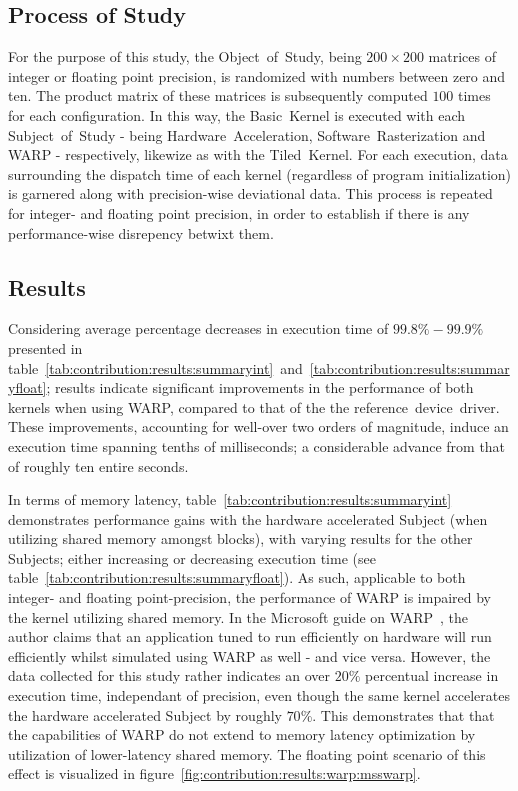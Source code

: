 \subsection{Process of Study}
\label{sec:contribution:processofstudy}
For the purpose of this study, the Object~of~Study, being $200\times 200$ matrices of integer or floating point precision, is randomized with numbers between zero and ten.
The product matrix of these matrices is subsequently computed $100$ times for each configuration.
In this way, the Basic~Kernel is executed with each Subject~of~Study - being Hardware~Acceleration, Software~Rasterization and WARP - respectively, likewize as with the Tiled~Kernel.
For each execution, data surrounding the dispatch time of each kernel (regardless of program initialization) is garnered along with precision-wise deviational data.
This process is repeated for integer- and floating point precision, in order to establish if there is any performance-wise disrepency betwixt them.

\subsection{Results}
\label{sec:contribution:results}
Considering average percentage decreases in execution time of $99.8\%-99.9\%$ presented in table~\ref{tab:contribution:results:summaryint}~and~\ref{tab:contribution:results:summaryfloat}; results indicate significant improvements in the performance of both kernels when using WARP, compared to that of the the reference~device~driver.
These improvements, accounting for well-over two orders of magnitude, induce an execution time spanning tenths of milliseconds; a considerable advance from that of roughly ten entire seconds.

In terms of memory latency, table~\ref{tab:contribution:results:summaryint} demonstrates performance gains with the hardware accelerated Subject (when utilizing shared memory amongst blocks), with varying results for the other Subjects; either increasing or decreasing execution time (see table~\ref{tab:contribution:results:summaryfloat}).
As such, applicable to both integer- and floating point-precision, the performance of WARP is impaired by the kernel utilizing shared memory.
In the Microsoft guide on WARP~, the author claims that an application tuned to run efficiently on hardware will run efficiently whilst simulated using WARP as well - and vice versa.
However, the data collected for this study rather indicates an over $20\%$ percentual increase in execution time, independant of precision, even though the same kernel accelerates the hardware accelerated Subject by roughly $70$\%.
This demonstrates that that the capabilities of WARP do not extend to memory latency optimization by utilization of lower-latency shared memory.
The floating point scenario of this effect is visualized in figure~\ref{fig:contribution:results:warp:msswarp}.

